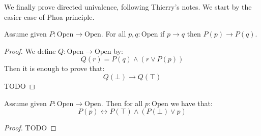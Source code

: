 We finally prove directed univalence, following Thierry's notes. We start by the easier case of Phoa principle.

\begin{lemma}\label{monotony-open}
Assume given $P:\mathrm{Open}\to\mathrm{Open}$. For all $p,q:\mathrm{Open}$ if $p\to q$ then $P(p)\to P(q)$.
\end{lemma}

\begin{proof}
We define $Q:\mathrm{Open}\to\mathrm{Open}$ by:
\[Q(r) = P(q)\land(r\lor P(p))\]
Then it is enough to prove that:
\[Q(\bot)\to Q(\top)\]
TODO
\end{proof}

\begin{lemma}
Assume given $P:\mathrm{Open}\to\mathrm{Open}$. Then for all $p:\mathrm{Open}$ we have that:
\[P(p) \leftrightarrow P(\top)\land(P(\bot)\lor p)\]
\end{lemma}

\begin{proof}
TODO
\end{proof}